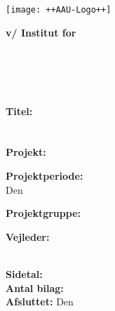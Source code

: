 

\cleardoublepage
{}
{}
\thispagestyle{empty}

\begin{minipage}[t]{0.48\textwidth}
\vspace*{-25pt}
\texttt{[image: ++AAU-Logo++]}
\end{minipage}
\hfill
\begin{minipage}[t]{0.48\textwidth}
{\small 
\textbf{v/ Institut for\\
\institutionname}\\
\studyname\\
\adress\\
\city\\
}
\end{minipage}
%
\vspace*{1cm}
%
\begin{minipage}[t]{0.48\textwidth}
\textbf{Titel:} \\[5pt]\bigskip\hspace{2ex}
\projectname\vspace{-2.75ex}\\ \bigskip \hspace{2ex}
\projectnameextension \\

%
\textbf{Projekt:} \\[5pt]\bigskip\hspace{2ex}
\semestername

\textbf{Projektperiode:} \\[5pt]\bigskip\hspace{2ex}
Den \projectperiod

\textbf{Projektgruppe:} \\[5pt]\bigskip\hspace{2ex}
\groupname


\textbf{Vejleder:} \\[5pt]\hspace*{2ex}
\supervisor \\\hspace*{2ex}

\textbf{Sidetal:} \numberofpages \\ %
\textbf{Antal bilag:} \numberofappendix \\ %
\textbf{Afsluttet:} Den \finishdate\ \finishyear
\end{minipage}
